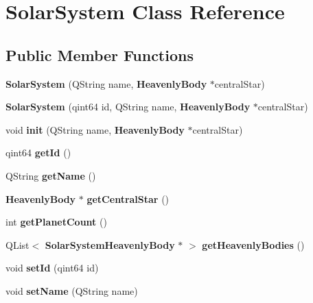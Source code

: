 \section{\-Solar\-System \-Class \-Reference}
\label{df/d5e/classSolarSystem}
\subsection*{\-Public \-Member \-Functions}
\begin{DoxyCompactItemize}
\item 
{\bfseries \-Solar\-System} (\-Q\-String name, {\bf \-Heavenly\-Body} $\ast$central\-Star)\label{df/d5e/classSolarSystem_acd1c223637e498a57d8cee6593f69137}

\item 
{\bfseries \-Solar\-System} (qint64 id, \-Q\-String name, {\bf \-Heavenly\-Body} $\ast$central\-Star)\label{df/d5e/classSolarSystem_afa3e85e6ab9fbe04e2cb80dc02c69dfc}

\item 
void {\bfseries init} (\-Q\-String name, {\bf \-Heavenly\-Body} $\ast$central\-Star)\label{df/d5e/classSolarSystem_a051c4da538ac4a9495e775e60855786e}

\item 
qint64 {\bfseries get\-Id} ()\label{df/d5e/classSolarSystem_a6d73dac11e01ecf06906ede55e8b77fc}

\item 
\-Q\-String {\bfseries get\-Name} ()\label{df/d5e/classSolarSystem_a46abe6f8ea2f1db709d3fac9f1bbf00d}

\item 
{\bf \-Heavenly\-Body} $\ast$ {\bfseries get\-Central\-Star} ()\label{df/d5e/classSolarSystem_a90d1c7f9e05a1bd528b62056b27ff424}

\item 
int {\bfseries get\-Planet\-Count} ()\label{df/d5e/classSolarSystem_a2b6d483d05a984f94c2916f41d812f4b}

\item 
\-Q\-List$<$ {\bf \-Solar\-System\-Heavenly\-Body} $\ast$ $>$ {\bfseries get\-Heavenly\-Bodies} ()\label{df/d5e/classSolarSystem_ad9adea29a8b57fe361591cafce61b0e2}

\item 
void {\bfseries set\-Id} (qint64 id)\label{df/d5e/classSolarSystem_a97a3b70024c266b428cf4bea2ecdb45c}

\item 
void {\bfseries set\-Name} (\-Q\-String name)\label{df/d5e/classSolarSystem_a1642e94eaa54bc4e43471384f95dcc7d}


\end{DoxyCompactItemize}
